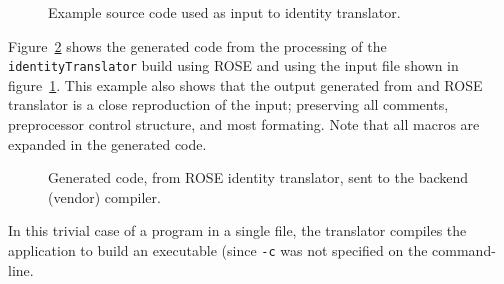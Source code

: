 \begin{figure}[!h]
{\indent
{\mySmallFontSize


\begin{latexonly}
   
\end{latexonly}

\begin{htmlonly}
   
\end{htmlonly}

}
}
\caption{Example source code used as input to identity translator.}
\label{Tutorial:exampleInputCode_IdentityTranslator}
\end{figure}

Figure~\ref{Tutorial:exampleOutputFromTranslator} shows the generated code from the
processing of the {\tt identityTranslator} build using ROSE and using the input file
shown in figure~\ref{Tutorial:exampleInputCode_IdentityTranslator}.
This example also shows that the output generated from and ROSE translator is
a close reproduction of the input; preserving all comments, preprocessor
control structure, and most formating.  Note that all macros are expanded in
the generated code.

\begin{figure}[!h]
{\indent
{\mySmallFontSize


\begin{latexonly}
   
\end{latexonly}

\begin{htmlonly}
   
\end{htmlonly}

}
}
\caption{Generated code, from ROSE identity translator, sent to the backend (vendor) compiler.}
\label{Tutorial:exampleOutputFromTranslator}
\end{figure}

  In this trivial case of a program in a single file, the translator
compiles the application to build an executable (since {\tt -c}
was not specified on the command-line.




